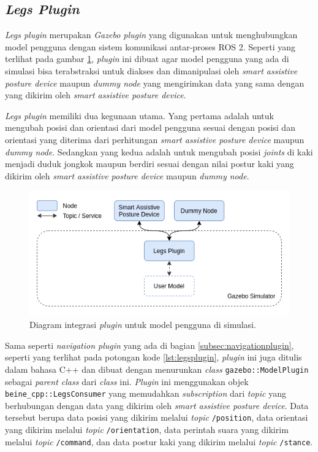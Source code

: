 \subsection{\emph{Legs Plugin}}
\label{subsec:legsplugin}

\emph{Legs plugin} merupakan \emph{Gazebo plugin} yang digunakan untuk menghubungkan model pengguna dengan sistem komunikasi antar-proses ROS 2.
Seperti yang terlihat pada gambar \ref{fig:integrasipluginpengguna},
  \emph{plugin} ini dibuat agar model pengguna yang ada di simulasi bisa terabstraksi untuk diakses dan dimanipulasi oleh \emph{smart assistive posture device} maupun \emph{dummy node} yang mengirimkan data yang sama dengan yang dikirim oleh \emph{smart assistive posture device}.

\emph{Legs plugin} memiliki dua kegunaan utama.
Yang pertama adalah untuk mengubah posisi dan orientasi dari model pengguna sesuai dengan posisi dan orientasi yang diterima dari perhitungan \emph{smart assistive posture device} maupun \emph{dummy node}.
Sedangkan yang kedua adalah untuk mengubah posisi \emph{joints} di kaki menjadi duduk jongkok maupun berdiri sesuai dengan nilai postur kaki yang dikirim oleh \emph{smart assistive posture device} maupun \emph{dummy node}.

\begin{figure} [ht]
  \centering
  \includegraphics[scale=0.5]{gambar/integrasi-plugin-pengguna.png}
  \caption{Diagram integrasi \emph{plugin} untuk model pengguna di simulasi.}
  \label{fig:integrasipluginpengguna}
\end{figure}



Sama seperti \emph{navigation plugin} yang ada di bagian \ref{subsec:navigationplugin},
  seperti yang terlihat pada potongan kode \ref{lst:legsplugin},
  \emph{plugin} ini juga ditulis dalam bahasa C++ dan dibuat dengan menurunkan \emph{class} \lstinline{gazebo::ModelPlugin} sebagai \emph{parent class} dari \emph{class} ini.
\emph{Plugin} ini menggunakan objek \lstinline{beine_cpp::LegsConsumer} yang memudahkan \emph{subscription} dari \emph{topic} yang berhubungan dengan data yang dikirim oleh \emph{smart assistive posture device}.
Data tersebut berupa data posisi yang dikirim melalui \emph{topic} \lstinline{/position},
  data orientasi yang dikirim melalui \emph{topic} \lstinline{/orientation},
  data perintah suara yang dikirim melalui \emph{topic} \lstinline{/command},
  dan data postur kaki yang dikirim melalui \emph{topic} \lstinline{/stance}.

